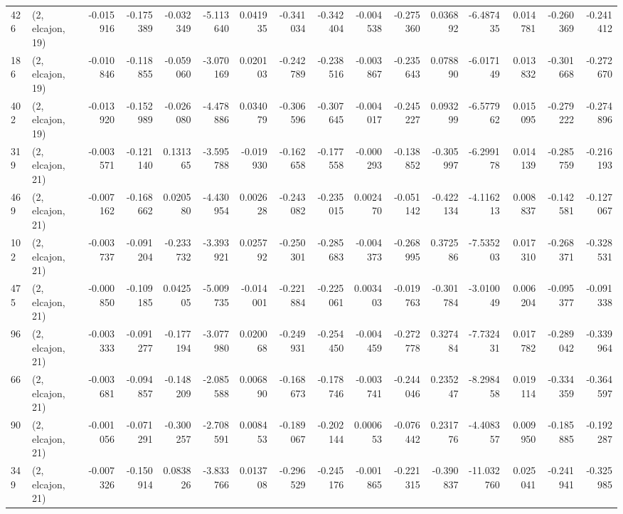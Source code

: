 \begin{tabular}{llrrrrrrrrrrrrrr}
426 &  (2, elcajon, 19) &  -0.015916 & -0.175389 & -0.032349 &   -5.113640 &  0.041935 &  -0.341034 & -0.342404 & -0.004538 & -0.275360 &  0.036892 &   -6.487435 &  0.014781 & -0.260369 & -0.241412 \\
186 &  (2, elcajon, 19) &  -0.010846 & -0.118855 & -0.059060 &   -3.070169 &  0.020103 &  -0.242789 & -0.238516 & -0.003867 & -0.235643 &  0.078890 &   -6.017149 &  0.013832 & -0.301668 & -0.272670 \\
402 &  (2, elcajon, 19) &  -0.013920 & -0.152989 & -0.026080 &   -4.478886 &  0.034079 &  -0.306596 & -0.307645 & -0.004017 & -0.245227 &  0.093299 &   -6.577962 &  0.015095 & -0.279222 & -0.274896 \\
319 &  (2, elcajon, 21) &  -0.003571 & -0.121140 &  0.131365 &   -3.595788 & -0.019930 &  -0.162658 & -0.177558 & -0.000293 & -0.138852 & -0.305997 &   -6.299178 &  0.014139 & -0.285759 & -0.216193 \\
469 &  (2, elcajon, 21) &  -0.007162 & -0.168662 &  0.020580 &   -4.430954 &  0.002628 &  -0.243082 & -0.235015 &  0.002470 & -0.051142 & -0.422134 &   -4.116213 &  0.008837 & -0.142581 & -0.127067 \\
102 &  (2, elcajon, 21) &  -0.003737 & -0.091204 & -0.233732 &   -3.393921 &  0.025792 &  -0.250301 & -0.285683 & -0.004373 & -0.268995 &  0.372586 &   -7.535203 &  0.017310 & -0.268371 & -0.328531 \\
475 &  (2, elcajon, 21) &  -0.000850 & -0.109185 &  0.042505 &   -5.009735 & -0.014001 &  -0.221884 & -0.225061 &  0.003403 & -0.019763 & -0.301784 &   -3.010049 &  0.006204 & -0.095377 & -0.091338 \\
96  &  (2, elcajon, 21) &  -0.003333 & -0.091277 & -0.177194 &   -3.077980 &  0.020068 &  -0.249931 & -0.254450 & -0.004459 & -0.272778 &  0.327484 &   -7.732431 &  0.017782 & -0.289042 & -0.339964 \\
66  &  (2, elcajon, 21) &  -0.003681 & -0.094857 & -0.148209 &   -2.085588 &  0.006890 &  -0.168673 & -0.178746 & -0.003741 & -0.244046 &  0.235247 &   -8.298458 &  0.019114 & -0.334359 & -0.364597 \\
90  &  (2, elcajon, 21) &  -0.001056 & -0.071291 & -0.300257 &   -2.708591 &  0.008453 &  -0.189067 & -0.202144 &  0.000653 & -0.076442 &  0.231776 &   -4.408357 &  0.009950 & -0.185885 & -0.192287 \\
349 &  (2, elcajon, 21) &  -0.007326 & -0.150914 &  0.083826 &   -3.833766 &  0.013708 &  -0.296529 & -0.245176 & -0.001865 & -0.221315 & -0.390837 &  -11.032760 &  0.025041 & -0.241941 & -0.325985 \\

\end{tabular}
